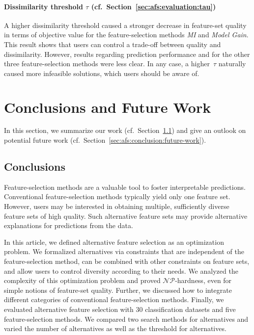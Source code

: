 \documentclass{article}
\theoremstyle{definition}
\begin{document}
\paragraph{Dissimilarity threshold $\tau$ (cf.~Section~\ref{sec:afs:evaluation:tau})}

A higher dissimilarity threshold caused a stronger decrease in feature-set quality in terms of objective value for the feature-selection methods \emph{MI} and \emph{Model Gain}.
This result shows that users can control a trade-off between quality and dissimilarity.
However, results regarding prediction performance and for the other three feature-selection methods were less clear.
In any case, a higher~$\tau$ naturally caused more infeasible solutions, which users should be aware of.

\section{Conclusions and Future Work}
\label{sec:afs:conclusion}

In this section, we summarize our work (cf.~Section~\ref{sec:afs:conclusion:conclusion}) and give an outlook on potential future work (cf.~Section~\ref{sec:afs:conclusion:future-work}).

\subsection{Conclusions}
\label{sec:afs:conclusion:conclusion}

Feature-selection methods are a valuable tool to foster interpretable predictions.
Conventional feature-selection methods typically yield only one feature set.
However, users may be interested in obtaining multiple, sufficiently diverse feature sets of high quality.
Such alternative feature sets may provide alternative explanations for predictions from the data.

In this article, we defined alternative feature selection as an optimization problem.
We formalized alternatives via constraints that are independent of the feature-selection method, can be combined with other constraints on feature sets, and allow users to control diversity according to their needs.
We analyzed the complexity of this optimization problem and proved $\mathcal{NP}$-hardness, even for simple notions of feature-set quality.
Further, we discussed how to integrate different categories of conventional feature-selection methods.
Finally, we evaluated alternative feature selection with 30 classification datasets and five feature-selection methods.
We compared two search methods for alternatives and varied the number of alternatives as well as the threshold for alternatives.
\end{document}
